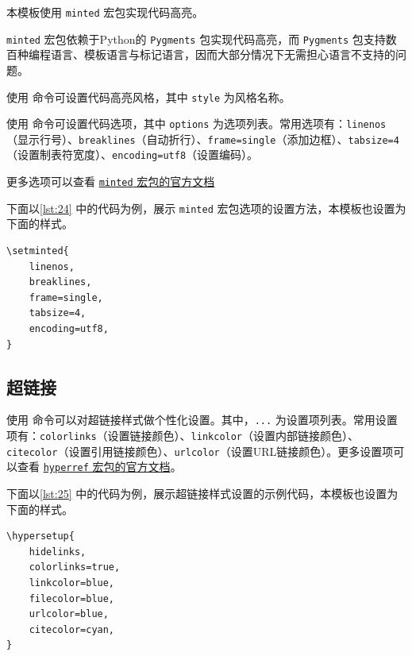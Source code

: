 \documentclass[a4paper]{article}
\begin{document}
本模板使用 \texttt{minted} 宏包实现代码高亮。

\texttt{minted} 宏包依赖于Python的 \texttt{Pygments} 包实现代码高亮，而 \texttt{Pygments} 包支持数百种编程语言、模板语言与标记语言，因而大部分情况下无需担心语言不支持的问题。

使用 \texttt{} 命令可设置代码高亮风格，其中 \texttt{style} 为风格名称。

使用 \texttt{} 命令可设置代码选项，其中 \texttt{options} 为选项列表。常用选项有：\texttt{linenos}（显示行号）、\texttt{breaklines}（自动折行）、\texttt{frame=single}（添加边框）、\texttt{tabsize=4}（设置制表符宽度）、\texttt{encoding=utf8}（设置编码）。

更多选项可以查看 \href{https://mirror.math.princeton.edu/pub/CTAN/macros/latex/contrib/minted/minted.pdf}{\texttt{minted} 宏包的官方文档}

下面以\cref{lst:24} 中的代码为例，展示 \texttt{minted} 宏包选项的设置方法，本模板也设置为下面的样式。

\begin{center}
    \label{lst:24}
    \begin{verbatim}
\setminted{
    linenos,
    breaklines,
	frame=single,
	tabsize=4,
	encoding=utf8,
}
    \end{verbatim}
\end{center}

\subsection{超链接}

使用 \texttt{\hypersetup{...}} 命令可以对超链接样式做个性化设置。其中，\texttt{...} 为设置项列表。常用设置项有：\texttt{colorlinks}（设置链接颜色）、\texttt{linkcolor}（设置内部链接颜色）、\texttt{citecolor}（设置引用链接颜色）、\texttt{urlcolor}（设置URL链接颜色）。更多设置项可以查看 \href{https://mirror.math.princeton.edu/pub/CTAN/macros/latex/contrib/hyperref/doc/hyperref-doc.pdf}{\texttt{hyperref} 宏包的官方文档}。

下面以\cref{lst:25} 中的代码为例，展示超链接样式设置的示例代码，本模板也设置为下面的样式。

\begin{center}
    \label{lst:25}
    \begin{verbatim}
\hypersetup{
    hidelinks,
    colorlinks=true,
    linkcolor=blue,
    filecolor=blue,      
    urlcolor=blue,
    citecolor=cyan,
}
    \end{verbatim}
\end{center}
\end{document}
